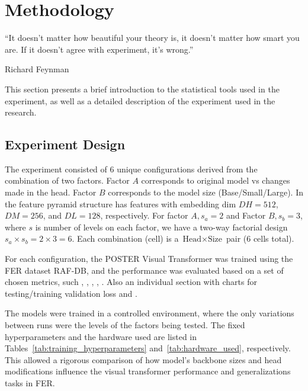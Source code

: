 


\chapter{Methodology}
\label{chapter:methodology}
\epigraph{``It doesn't matter how beautiful your theory is, it doesn't matter how smart you are. If it doesn't agree with experiment, it's wrong.''}{\vspace{10pt}Richard Feynman}

\newpage

This section presents a brief introduction to the statistical tools used in the experiment, as well as a detailed description of the experiment used in the research. 


\section{Experiment Design}
\label{section:experiment-design}

The experiment consisted of 6 unique configurations derived from the combination of  two factors. Factor  $A$ corresponds to original model vs changes made in the head. Factor $B$ corresponds to the model size (Base/Small/Large). In  \cite{zheng_poster_2022} the feature pyramid structure has features with embedding dim $DH = 512$, $DM = 256$, and $DL = 128$, respectively. For factor $A, s_a =2$ and Factor $B, s_b=3$, where $s$ is number of levels on each factor, we have a two-way factorial design $s_a \times s_b = 2 \times 3 = 6$. Each combination (cell) is a $\text{Head} \times \text{Size}$ pair (6 cells total).


For each configuration, the \gls{POSTER} Visual Transformer was trained using  the \gls{FER} dataset RAF-DB, and the performance was evaluated based on a set of chosen metrics, such , ,  ,  ,  . Also an individual section with charts for testing/training validation loss  and .

The models were trained in a controlled environment, where the only variations between runs were the levels of the factors being tested. The fixed hyperparameters and the hardware used are listed in Tables~\ref{tab:training_hyperparameters} and~\ref{tab:hardware_used}, respectively. This allowed a rigorous comparison of how  model's backbone sizes and head modifications influence the visual transformer performance and generalizations tasks in \gls{FER}.

